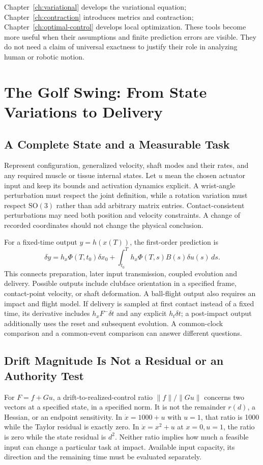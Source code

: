 Chapter~\ref{ch:variational} develops the variational equation;
Chapter~\ref{ch:contraction} introduces metrics and contraction;
Chapter~\ref{ch:optimal-control} develops local optimization. These tools become more useful
when their assumptions and finite prediction errors are visible. They do not need a claim
of universal exactness to justify their role in analyzing human or robotic motion.

\section{The Golf Swing: From State Variations to Delivery}

\subsection{A Complete State and a Measurable Task}

Represent configuration, generalized velocity, shaft modes and their rates, and any required
muscle or tissue internal states. Let $u$ mean the chosen actuator input and keep its
bounds and activation dynamics explicit. A wrist-angle perturbation must respect the joint
definition, while a rotation variation must respect $\mathrm{SO}(3)$ rather than add arbitrary
matrix entries. Contact-consistent perturbations may need both position and velocity
constraints. A change of recorded coordinates should not change the physical conclusion.

For a fixed-time output $y=h(x(T))$, the first-order prediction is
\[
\delta y=h_x\Phi(T,t_0)\delta x_0+
\int_{t_0}^T h_x\Phi(T,s)B(s)\delta u(s)\,ds.
\]
This connects preparation, later input transmission, coupled evolution and delivery.
Possible outputs include clubface orientation in a specified frame, contact-point velocity,
or shaft deformation. A ball-flight output also requires an impact and flight model.
If delivery is sampled at first contact instead of a fixed time, its derivative includes
$h_xF^-\delta t$ and any explicit $h_t\delta t$; a post-impact output additionally uses
the reset and subsequent evolution. A common-clock comparison and a common-event comparison
can answer different questions.

\subsection{Drift Magnitude Is Not a Residual or an Authority Test}

For $F=f+Gu$, a drift-to-realized-control ratio $\|f\|/\|Gu\|$ concerns two vectors at a
specified state, in a specified norm. It is not the remainder $r(d)$, a Hessian, or an
endpoint sensitivity. In $\dot x=1000+u$ with $u=1$, that ratio is 1000 while the Taylor
residual is exactly zero. In $\dot x=x^2+u$ at $x=0,u=1$, the ratio is zero while the
state residual is $d^2$. Neither ratio implies how much a feasible input can change a
particular task at impact. Available input capacity, its direction and the remaining
time must be evaluated separately.

